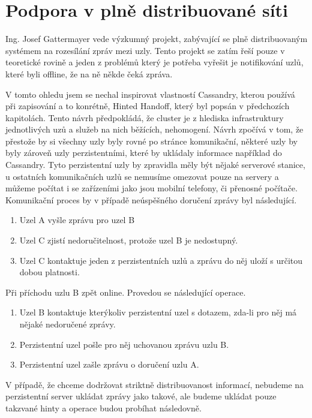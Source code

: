 \documentclass[thesis=M,czech]{FITthesis}[2012/06/26]
\begin{document}
\section{Podpora v plně distribuované síti}
Ing. Josef Gattermayer vede výzkumný projekt, zabývající se plně distribuovaným systémem na rozesílání zpráv mezi uzly. Tento projekt se zatím řeší pouze v teoretické rovině a jeden z problémů který je potřeba vyřešit je notifikování uzlů, které byli offline, že na ně někde čeká zpráva. 

V tomto ohledu jsem se nechal inspirovat vlastností Cassandry, kterou používá při zapisování a to konrétně, Hinted Handoff, který byl popsán v předchozích kapitolách. Tento návrh předpokládá, že cluster je z hlediska infrastruktury jednotlivých uzů a služeb na nich běžících, nehomogení. Návrh zpočívá v tom, že přestože by si všechny uzly byly rovné po stránce komunikační, některé uzly by byly zároveň uzly perzistentními, které by ukládaly informace například do Cassandry. Tyto perzistentní uzly by zpravidla měly být nějaké serverové stanice, u ostatních komunikačních uzlů se nemusíme omezovat pouze na servery a můžeme počítat i se zařízeními jako jsou mobilní telefony, či přenosné počítače. Komunikační proces by v případě neúspěšného doručení zprávy byl následující. 

\begin{enumerate}
\item Uzel A vyšle zprávu pro uzel B
\item Uzel C zjistí nedoručitelnost, protože uzel B je nedostupný.
\item Uzel C kontaktuje jeden z perzistentních uzlů a zprávu do něj uloží s určitou dobou platnosti. 
\end{enumerate}

Při příchodu uzlu B zpět online. Provedou se následující operace.

\begin{enumerate}
\item Uzel B kontaktuje kterýkoliv perzistentní uzel s dotazem, zda-li pro něj má nějaké nedoručené zprávy.
\item Perzistentní uzel pošle pro něj uchovanou zprávu uzlu B.
\item Perzistentní uzel zašle zprávu o doručení uzlu A.
\end{enumerate}


V případě, že chceme dodržovat striktně distribuovanost informací, nebudeme na perzistentní server ukládat zprávy jako takové, ale budeme ukládat pouze takzvané hinty a operace budou probíhat následovně. 
\end{document}
